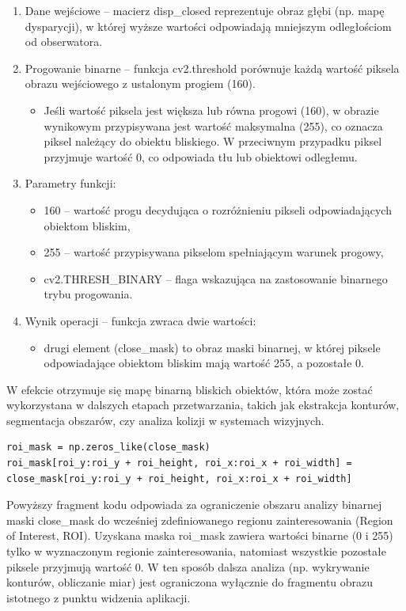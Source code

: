 \documentclass[magisterska]{pracadypl}
\begin{document}
\begin{enumerate}
  \item Dane wejściowe – macierz disp\_closed reprezentuje obraz głębi (np. mapę dysparycji), w której wyższe wartości odpowiadają mniejszym odległościom od obserwatora.
  \item Progowanie binarne – funkcja cv2.threshold porównuje każdą wartość piksela obrazu wejściowego z ustalonym progiem (160).
    \begin{itemize}
      \item Jeśli wartość piksela jest większa lub równa progowi (160), w obrazie wynikowym przypisywana jest wartość maksymalna (255), co oznacza piksel należący do obiektu bliskiego. W przeciwnym przypadku piksel przyjmuje wartość 0, co odpowiada tłu lub obiektowi odległemu.
    \end{itemize}
  \item Parametry funkcji:
    \begin{itemize}
      \item 160 – wartość progu decydująca o rozróżnieniu pikseli odpowiadających obiektom bliskim,
      \item 255 – wartość przypisywana pikselom spełniającym warunek progowy,
      \item cv2.THRESH\_BINARY – flaga wskazująca na zastosowanie binarnego trybu progowania.
    \end{itemize}
  \item Wynik operacji – funkcja zwraca dwie wartości:
    \begin{itemize}
      \item drugi element (close\_mask) to obraz maski binarnej, w której piksele odpowiadające obiektom bliskim mają wartość 255, a pozostałe 0.
    \end{itemize}
\end{enumerate}

W efekcie otrzymuje się mapę binarną bliskich obiektów, która może zostać wykorzystana w dalszych etapach przetwarzania, takich jak ekstrakcja konturów, segmentacja obszarów, czy analiza kolizji w systemach wizyjnych.

\begin{lstlisting}[style=mypython]
roi_mask = np.zeros_like(close_mask)
roi_mask[roi_y:roi_y + roi_height, roi_x:roi_x + roi_width] = close_mask[roi_y:roi_y + roi_height, roi_x:roi_x + roi_width]
\end{lstlisting}

Powyższy fragment kodu odpowiada za ograniczenie obszaru analizy binarnej maski close\_mask do wcześniej zdefiniowanego regionu zainteresowania (Region of Interest, ROI). Uzyskana maska roi\_mask zawiera wartości binarne (0 i 255) tylko w wyznaczonym regionie zainteresowania, natomiast wszystkie pozostałe piksele przyjmują wartość 0. W ten sposób dalsza analiza (np. wykrywanie konturów, obliczanie miar) jest ograniczona wyłącznie do fragmentu obrazu istotnego z punktu widzenia aplikacji.
\end{document}
